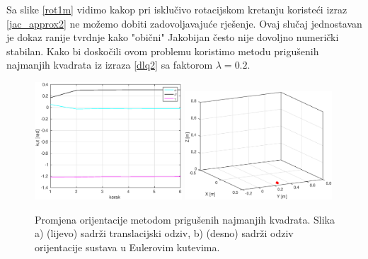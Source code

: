 \documentclass[times, utf8, diplomski, numeric]{fer}
\begin{document}
Sa slike \ref{rot1m} vidimo kakop pri isklučivo rotacijskom kretanju koristeći izraz \ref{jac_approx2} ne možemo dobiti zadovoljavajuće rješenje.
Ovaj slučaj jednostavan je dokaz ranije tvrdnje kako "obični" Jakobijan često nije dovoljno numerički stabilan.
Kako bi doskočili ovom problemu koristimo metodu prigušenih najmanjih kvadrata iz izraza \ref{dlq2} sa faktorom $\lambda = 0.2$.
\begin{figure}[h!]
\centering
\includegraphics[width = 0.49\textwidth]{matlab_rot2}
\includegraphics[width = 0.49\textwidth]{matlab_rot2_xyz}
\caption{Promjena orijentacije metodom prigušenih najmanjih kvadrata.
Slika a) (lijevo) sadrži translacijski odziv, b) (desno) sadrži odziv orijentacije sustava u Eulerovim kutevima.} \label{rot2m}
\end{figure}
\end{document}

